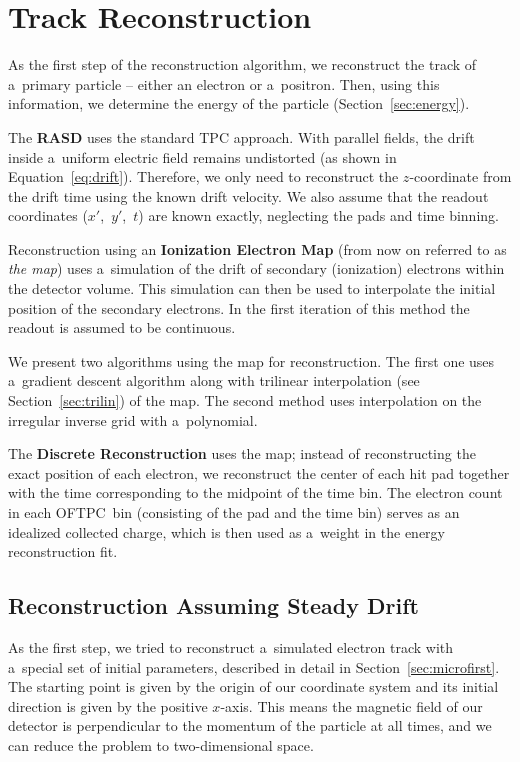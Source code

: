 \chapter{Track Reconstruction}
\label{sec:track}
	As the first step of the reconstruction algorithm, we reconstruct the track of a~primary particle -- either an electron or a~positron. Then, using this information, we determine the energy of the particle (Section~\ref{sec:energy}).
	
	The \textbf{\acf{RASD}} uses the standard \ac{TPC} approach. With parallel fields, the drift inside a~uniform electric field remains undistorted (as shown in Equation~\ref{eq:drift}). Therefore, we only need to reconstruct the $z$\nobreakdash-coordinate from the drift time using the known drift velocity. We also assume that the readout coordinates ($x'$,~$y'$,~$t$) are known exactly, neglecting the pads and time binning.
	
	Reconstruction using an \textbf{Ionization Electron Map} (from now on referred to as \emph{the map}) uses a~simulation of the drift of secondary (ionization) electrons within the detector volume. This simulation can then be used to interpolate the initial position of the secondary electrons. In the first iteration of this method the readout is assumed to be continuous.
	
	We present two algorithms using the map for reconstruction. The first one uses a~gradient descent algorithm along with trilinear interpolation (see Section~\ref{sec:trilin}) of the map. The second method uses interpolation on the irregular inverse grid with a~polynomial.
	
	The \textbf{Discrete Reconstruction} uses the map; instead of reconstructing the exact position of each electron, we reconstruct the center of each hit pad together with the time corresponding to the midpoint of the time bin. The electron count in each \ac{OFTPC}~bin (consisting of the pad and the time bin) serves as an idealized collected charge, which is then used as a~weight in the energy reconstruction fit.
	
	\section{Reconstruction Assuming Steady Drift}
	\label{sec:rasd}
		As the first step, we tried to reconstruct a~simulated electron track with a~special set of initial parameters, described in detail in Section~\ref{sec:microfirst}. The starting point is given by the origin of our coordinate system and its initial direction is given by the positive $x$\nobreakdash-axis. This means the magnetic field of our detector is perpendicular to the momentum of the particle at all times, and we can reduce the problem to two-dimensional space.
		
